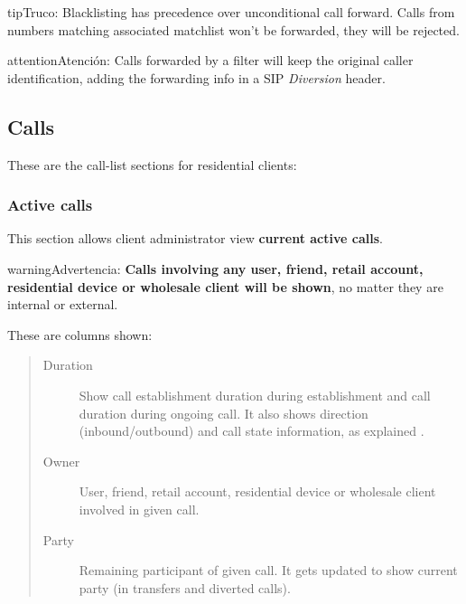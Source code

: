 \documentclass[letterpaper,10pt,spanish]{sphinxmanual}
\begin{document}
\begin{notice}{tip}{Truco:}
Blacklisting has precedence over unconditional call forward. Calls from numbers
matching associated matchlist won't be forwarded, they will be rejected.
\end{notice}

\begin{notice}{attention}{Atención:}
Calls forwarded by a filter will keep the original
caller identification, adding the forwarding info in a SIP
\emph{Diversion} header.
\end{notice}


\subsection{Calls}
\label{administration_portal/client/residential/calls/index::doc}\label{administration_portal/client/residential/calls/index:calls}
These are the call-list sections for residential clients:


\subsubsection{Active calls}
\label{administration_portal/client/residential/calls/active_calls::doc}\label{administration_portal/client/residential/calls/active_calls:active-calls}
This section allows client administrator view \textbf{current active calls}.

\begin{notice}{warning}{Advertencia:}
\textbf{Calls involving any user, friend, retail account, residential device or wholesale client will be shown},
no matter they are internal or external.
\end{notice}

These are columns shown:
\begin{quote}
\begin{description}
\item[{Duration}] \leavevmode
Show call establishment duration during establishment and call duration during ongoing call. It also shows
direction (inbound/outbound) and call state information, as explained {\hyperref[administration_portal/platform/active_calls:call\string-state]{}}.

\item[{Owner}] \leavevmode
User, friend, retail account, residential device or wholesale client involved in given call.

\item[{Party}] \leavevmode
Remaining participant of given call. It gets updated to show current party (in transfers and diverted calls).

\end{description}
\end{quote}
\end{document}
